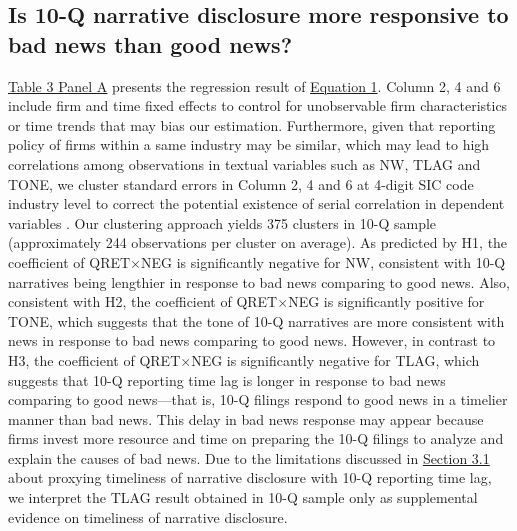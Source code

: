 \documentclass[a4paper]{article}
\begin{document}
\begin{spacing}{2}
\subsection{Is 10-Q narrative disclosure more responsive to bad news than good news?}
\hyperref[T3PA]{Table 3 Panel A} presents the regression result of \hyperref[eq1]{Equation 1}. Column 2, 4 and 6 include firm and time fixed effects to control for unobservable firm characteristics or time trends that may bias our estimation. Furthermore, given that reporting policy of firms within a same industry may be similar, which may lead to high correlations among observations in textual variables such as NW, TLAG and TONE, we cluster standard errors in Column 2, 4 and 6 at 4-digit SIC code industry level to correct the potential existence of serial correlation in dependent variables . Our clustering approach yields 375 clusters in 10-Q sample (approximately 244 observations per cluster on average). As predicted by H1, the coefficient of QRET$\times$NEG is significantly negative for NW, consistent with 10-Q narratives being lengthier in response to bad news comparing to good news. Also, consistent with H2, the coefficient of QRET$\times$NEG is significantly positive for TONE, which suggests that the tone of 10-Q narratives are more consistent with news in response to bad news comparing to good news. However, in contrast to H3, the coefficient of QRET$\times$NEG is significantly negative for TLAG, which suggests that 10-Q reporting time lag is longer in response to bad news comparing to good news---that is, 10-Q filings respond to good news in a timelier manner than bad news. This delay in bad news response may appear because firms invest more resource and time on preparing the 10-Q filings to analyze and explain the causes of bad news. Due to the limitations discussed in \hyperref[sec3.1]{Section 3.1} about proxying timeliness of narrative disclosure with 10-Q reporting time lag, we interpret the TLAG result obtained in 10-Q sample only as supplemental evidence on timeliness of narrative disclosure.


\end{spacing}
\end{document}

